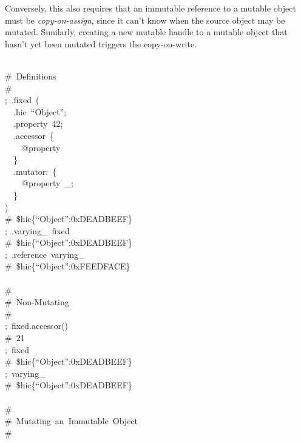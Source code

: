 \documentclass[preprint]{{sigplanconf}}
\begin{document}
Conversely, this also requires that an immutable reference to a mutable
object must be \emph{copy-on-assign}, since it can't know when the source
object may be mutated. Similarly, creating a new mutable handle to a
mutable object that hasn't yet been mutated triggers the copy-on-write.%
\begin{mdpre}%
\\
{\#~Definitions}\\
{\#}\\
;~.fixed~(\\
~~.hic~“{Object}”;\\
~~.property~{42};\\
~~.accessor~\{\\
~~~~{@property}\\
~~\}\\
~~.mutator{:}~\{\\
~~~~{@property}~\_;\\
~~\}\\
)\\
{\#~\$hic\{“Object”:0xDEADBEEF\}}\\
;~.varying\_~fixed\\
{\#~\$hic\{“Object”:0xDEADBEEF\}}\\
;~.reference~varying\_\\
{\#~\$hic\{“Object”:0xFEEDFACE\}}\\
\\
{\#}\\
{\#~Non-Mutating}\\
{\#}\\
;~fixed.accessor()\\
{\#~21}\\
;~fixed\\
{\#~\$hic\{“Object”:0xDEADBEEF\}}\\
;~varying\_\\
{\#~\$hic\{“Object”:0xDEADBEEF\}}\\
\\
{\#}\\
{\#~Mutating~an~Immutable~Object}\\
{\#}\\

\end{mdpre}
\end{document}
